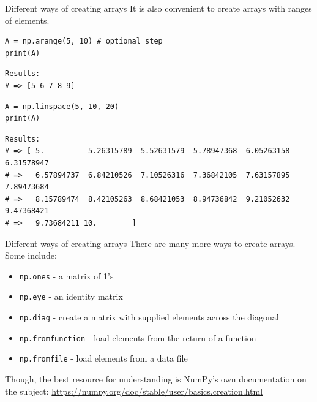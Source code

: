 \documentclass[10pt]{beamer}
\begin{document}
\begin{frame}[label={sec:org0d3a7d4},fragile]{Different ways of creating arrays}
 It is also convenient to create arrays with ranges of elements.

\begin{verbatim}
A = np.arange(5, 10) # optional step
print(A)
\end{verbatim}

\begin{verbatim}
Results: 
# => [5 6 7 8 9]
\end{verbatim}


\begin{verbatim}
A = np.linspace(5, 10, 20)
print(A)
\end{verbatim}

\begin{verbatim}
Results: 
# => [ 5.          5.26315789  5.52631579  5.78947368  6.05263158  6.31578947
# =>   6.57894737  6.84210526  7.10526316  7.36842105  7.63157895  7.89473684
# =>   8.15789474  8.42105263  8.68421053  8.94736842  9.21052632  9.47368421
# =>   9.73684211 10.        ]
\end{verbatim}
\end{frame}


\begin{frame}[label={sec:org544173d},fragile]{Different ways of creating arrays}
 There are many more ways to create arrays. Some include:

\begin{itemize}
\item \texttt{np.ones}  - a matrix of 1's
\item \texttt{np.eye} - an identity matrix
\item \texttt{np.diag} - create a matrix with supplied elements across the diagonal
\item \texttt{np.fromfunction} - load elements from the return of a function
\item \texttt{np.fromfile} - load elements from a data file
\end{itemize}

Though, the best resource for understanding is NumPy's own documentation on the
subject: \url{https://numpy.org/doc/stable/user/basics.creation.html}
\end{frame}
\end{document}
